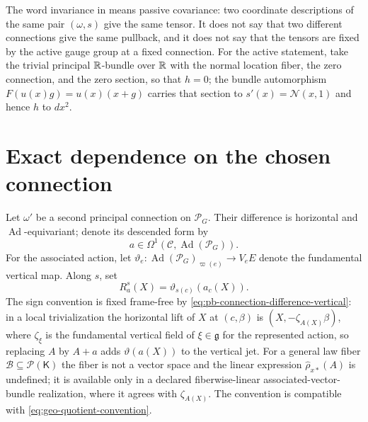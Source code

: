 The word invariance in  means passive
covariance: two coordinate descriptions of the same pair $(\omega,s)$ give the
same tensor.  It does not say that two different connections give the same
pullback, and it does not say that the tensors are fixed by the active gauge
group at a fixed connection.  For the active statement, take the trivial
principal $\mathbb R$-bundle over $\mathbb R$ with the normal location fiber, the zero
connection, and the zero section, so that $h=0$; the bundle automorphism
$F(u(x)g)=u(x)(x+g)$ carries that section to $s'(x)=\mathcal N(x,1)$ and hence
$h$ to $dx^2$.  

\section{Exact dependence on the chosen connection}
\label{sec:pb-connection-dependence}

Let $\omega'$ be a second principal connection on $\mathscr P_G$.  Their difference is
horizontal and $\operatorname{Ad}$-equivariant; denote its descended form by
\begin{equation}
a\in\Omega^1(\mathcal C,\operatorname{Ad}(\mathscr P_G)).
\label{eq:pb-connection-difference}
\end{equation}
For the associated action, let
$\vartheta_e:\operatorname{Ad}(\mathscr P_G)_{\varpi(e)}\to V_eE$ denote the fundamental
vertical map.  Along $s$, set
\begin{equation}
R_a^s(X)=\vartheta_{s(c)}(a_c(X)).
\label{eq:pb-connection-difference-vertical}
\end{equation}
The sign convention is fixed frame-free by
\eqref{eq:pb-connection-difference-vertical}: in a local trivialization the
horizontal lift of $X$ at $(c,\beta)$ is $(X,-\zeta_{A(X)}\beta)$, where
$\zeta_\xi$ is the fundamental vertical field of $\xi\in\mathfrak g$ for the
represented action, so replacing $A$ by $A+a$ adds $\vartheta(a(X))$ to the
vertical jet.  For a general law fiber $\mathcal B\subseteq\mathcal P(\mathsf K)$
the fiber is not a vector space and the linear expression
$\widehat\rho_{x*}(A)$ is undefined; it is available only in a declared
fiberwise-linear associated-vector-bundle realization, where it agrees with
$\zeta_{A(X)}$.  The convention is compatible with
\eqref{eq:geo-quotient-convention}.  


